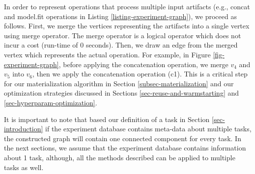 In order to represent operations that process multiple input artifacts (e.g., concat and model.fit operations in Listing \ref{listing-experiment-graph}), we proceed as follows.
First, we merge the vertices representing the artifacts into a single vertex using merge operator.
The merge operator is a logical operator which does not incur a cost (run-time of 0 seconds).
Then, we draw an edge from the merged vertex which represents the actual operation.
For example, in Figure \ref{fig-experiment-graph}, before applying the concatenation operation, we merge $v_4$ and $v_5$ into $v_6$, then we apply the concatenation operation (c1).
This is a critical step for our materialization algorithm in Section \ref{subsec-materialization} and our optimization strategies discussed in Sections \ref{sec-reuse-and-warmstarting} and \ref{sec-hyperparam-optimization}.

It is important to note that based our definition of a task in Section \ref{sec-introduction} if the experiment database contains meta-data about multiple tasks, the constructed graph will contain one connected component for every task.
In the next sections, we assume that the experiment database contains information about 1 task, although, all the methods described can be applied to multiple tasks as well.

